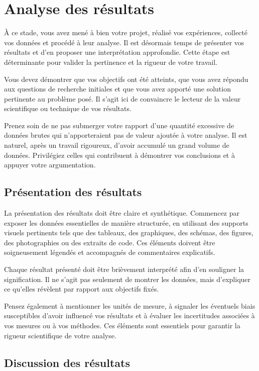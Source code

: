 \chapter{Analyse des résultats}

À ce stade, vous avez mené à bien votre projet, réalisé vos expériences, collecté vos données et procédé à leur analyse. Il est désormais temps de présenter vos résultats et d'en proposer une interprétation approfondie. Cette étape est déterminante pour valider la pertinence et la rigueur de votre travail.

Vous devez démontrer que vos objectifs ont été atteints, que vous avez répondu aux questions de recherche initiales et que vous avez apporté une solution pertinente au problème posé. Il s'agit ici de convaincre le lecteur de la valeur scientifique ou technique de vos résultats.

Prenez soin de ne pas submerger votre rapport d'une quantité excessive de données brutes qui n'apporteraient pas de valeur ajoutée à votre analyse. Il est naturel, après un travail rigoureux, d'avoir accumulé un grand volume de données. Privilégiez celles qui contribuent à démontrer vos conclusions et à appuyer votre argumentation.

\section{Présentation des résultats}

La présentation des résultats doit être claire et synthétique. Commencez par exposer les données essentielles de manière structurée, en utilisant des supports visuels pertinents tels que des tableaux, des graphiques, des schémas, des figures, des photographies ou des extraits de code. Ces éléments doivent être soigneusement légendés et accompagnés de commentaires explicatifs.

Chaque résultat présenté doit être brièvement interprété afin d'en souligner la signification. Il ne s'agit pas seulement de montrer les données, mais d'expliquer ce qu'elles révèlent par rapport aux objectifs fixés.

Pensez également à mentionner les unités de mesure, à signaler les éventuels biais susceptibles d'avoir influencé vos résultats et à évaluer les incertitudes associées à vos mesures ou à vos méthodes. Ces éléments sont essentiels pour garantir la rigueur scientifique de votre analyse.

\section{Discussion des résultats}


